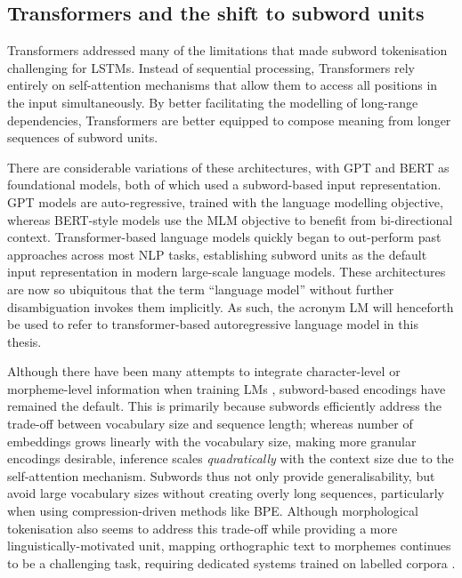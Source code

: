 \subsection{Transformers and the shift to subword units}

Transformers \citep{vaswani2017attention} addressed many of the limitations that made subword tokenisation challenging for LSTMs. Instead of sequential processing, Transformers rely entirely on self-attention mechanisms that allow them to access all positions in the input simultaneously. By better facilitating the modelling of long-range dependencies, Transformers are better equipped to compose meaning from longer sequences of subword units. 

There are considerable variations of these architectures, with GPT \citep{radford2018gpt1} and BERT \citep{devlin2019bert} as foundational models, both of which used a subword-based input representation. GPT models are auto-regressive, trained with the language modelling objective, whereas BERT-style models use the MLM objective to benefit from bi-directional context. Transformer-based language models quickly began to out-perform past approaches across most NLP tasks, establishing subword units as the default input representation in modern large-scale language models. These architectures are now so ubiquitous that the term ``language model'' without further disambiguation invokes them implicitly. As such, the acronym LM will henceforth be used to refer to transformer-based autoregressive language model in this thesis.

Although there have been many attempts to integrate character-level or morpheme-level information when training LMs \citep[e.g.][]{ma-etal-2020-charbert, nzeyimana-niyongabo-rubungo-2022-kinyabert}, subword-based encodings have remained the default. This is primarily because subwords efficiently address the trade-off between vocabulary size and sequence length; whereas number of embeddings grows linearly with the vocabulary size, making more granular encodings desirable, inference scales \emph{quadratically} with the context size due to the self-attention mechanism. Subwords thus not only provide generalisability, but avoid large vocabulary sizes without creating overly long sequences, particularly when using compression-driven methods like BPE. Although morphological tokenisation also seems to address this trade-off while providing a more linguistically-motivated unit, mapping orthographic text to morphemes continues to be a challenging task, requiring dedicated systems trained on labelled corpora \citep{batsuren-etal-2022-sigmorphon}. 

